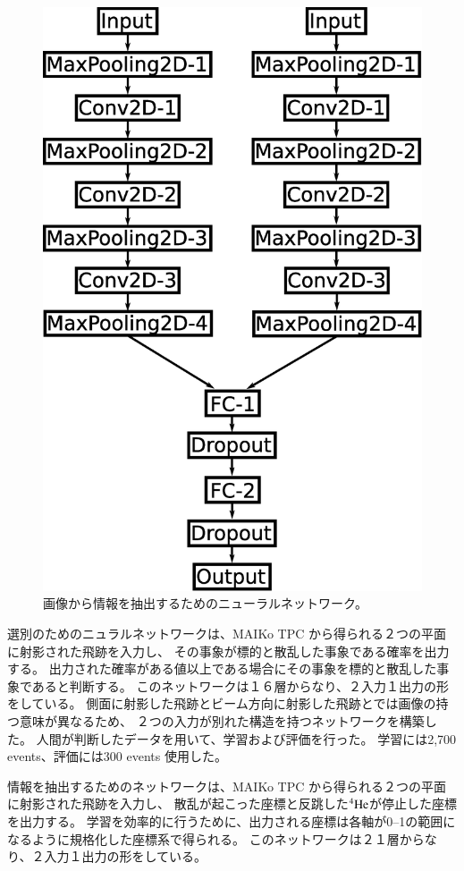 \documentclass{jps-cp}
\begin{document}
\begin{figure}
\begin{minipage}{0.45\columnwidth}
    \includegraphics[clip, width=0.8\columnwidth]{eps/point_detection.eps}
    \caption{画像から情報を抽出するためのニューラルネットワーク。}
    \label{fig:extraction}
  \end{minipage}
\end{figure}

選別のためのニュラルネットワークは、MAIKo TPC から得られる２つの平面に射影された飛跡を入力し、
その事象が標的と散乱した事象である確率を出力する。
出力された確率がある値以上である場合にその事象を標的と散乱した事象であると判断する。
このネットワークは１６層からなり、２入力１出力の形をしている。
側面に射影した飛跡とビーム方向に射影した飛跡とでは画像の持つ意味が異なるため、
２つの入力が別れた構造を持つネットワークを構築した。
人間が判断したデータを用いて、学習および評価を行った。
学習には2,700 events、評価には300 events 使用した。

情報を抽出するためのネットワークは、MAIKo TPC から得られる２つの平面に射影された飛跡を入力し、
散乱が起こった座標と反跳した${}^{4}\rm{He}$が停止した座標を出力する。
学習を効率的に行うために、出力される座標は各軸が0--1の範囲になるように規格化した座標系で得られる。
このネットワークは２１層からなり、２入力１出力の形をしている。
\end{document}
